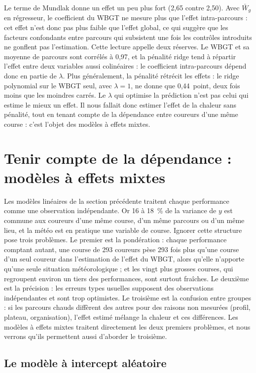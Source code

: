 \documentclass[11pt,a4paper]{article}
\begin{document}
Le terme de Mundlak donne un effet un peu plus fort (2,65 contre 2,50). Avec $\bar W_g$ en régresseur, le coefficient
du WBGT ne mesure plus que l'effet intra-parcours : cet effet n'est donc pas plus faible que l'effet global, ce qui
suggère que les facteurs confondants entre parcours qui subsistent une fois les contrôles introduits ne gonflent pas
l'estimation. Cette lecture appelle deux réserves. Le WBGT et sa moyenne de parcours sont corrélés à 0,97, et la
pénalité ridge tend à répartir l'effet entre deux variables aussi colinéaires : le coefficient intra-parcours dépend
donc en partie de $\lambda$. Plus généralement, la pénalité rétrécit les effets : le ridge polynomial sur le WBGT seul,
avec $\lambda = 1$, ne donne que 0,44~point, deux fois moins que les moindres carrés. Le $\lambda$ qui optimise la
prédiction n'est pas celui qui estime le mieux un effet. Il nous fallait donc estimer l'effet de la chaleur sans
pénalité, tout en tenant compte de la dépendance entre coureurs d'une même course : c'est l'objet des modèles à effets
mixtes.

\section{Tenir compte de la dépendance : modèles à effets mixtes}\label{sec:mixtes}

Les modèles linéaires de la section précédente traitent chaque performance comme une observation indépendante. Or
16 à 18~\% de la variance de $y$ est commune aux coureurs d'une même course, d'un même parcours ou d'un même lieu, et
la météo est en pratique une variable de course. Ignorer cette structure pose trois problèmes. Le premier est la
pondération : chaque performance comptant autant, une course de 293 coureurs pèse 293 fois plus qu'une course d'un
seul coureur dans l'estimation de l'effet du WBGT, alors qu'elle n'apporte qu'une seule situation météorologique ; et
les vingt plus grosses courses, qui regroupent environ un tiers des performances, sont surtout fraîches. Le deuxième
est la précision : les erreurs types usuelles supposent des observations indépendantes et sont trop optimistes. Le
troisième est la confusion entre groupes : si les parcours chauds diffèrent des autres pour des raisons non mesurées
(profil, plateau, organisation), l'effet estimé mélange la chaleur et ces différences. Les modèles à effets mixtes
traitent directement les deux premiers problèmes, et nous verrons qu'ils permettent aussi d'aborder le troisième.

\subsection{Le modèle à intercept aléatoire}\label{sec:intercept_aleatoire}
\end{document}
